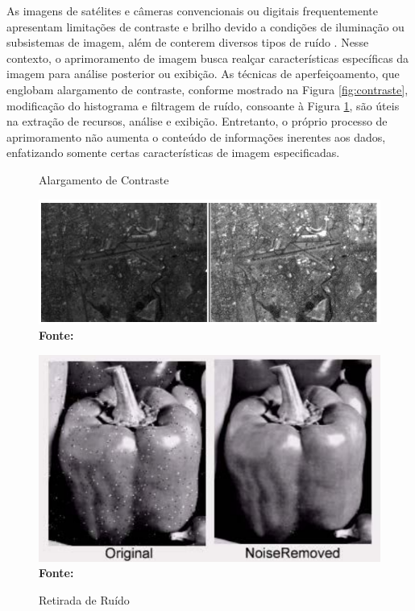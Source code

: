 As imagens de satélites e câmeras convencionais ou digitais frequentemente apresentam limitações de contraste e brilho devido a condições de iluminação ou subsistemas de imagem, além de conterem diversos tipos de ruído \cite{techniques}. Nesse contexto, o aprimoramento de imagem busca realçar características específicas da imagem para análise posterior ou exibição. As técnicas de aperfeiçoamento, que englobam alargamento de contraste, conforme mostrado na Figura \ref{fig:contraste}, modificação do histograma e filtragem de ruído, consoante à Figura \ref{fig:ruido}, são úteis na extração de recursos, análise e exibição. Entretanto, o próprio processo de aprimoramento não aumenta o conteúdo de informações inerentes aos dados, enfatizando somente certas características de imagem especificadas.

\begin{figure}[ht]
\centering
\begin{minipage}[b]{0.45\linewidth}
\centering
\caption{Alargamento de Contraste}
\includegraphics[width=\textwidth]{figuras/Alargamento de Contraste.png}
\label{fig:contraste}
\vspace{-0.2cm}
\textbf{\footnotesize Fonte: \cite{techniques}}
\end{minipage}
\hspace{0.5cm}
\begin{minipage}[b]{0.45\linewidth}
\centering
\caption{Retirada de Ruído}
\includegraphics[width=\textwidth]{figuras/Retirada de Ruido.png}
\label{fig:ruido}
\vspace{-0.2cm}
\textbf{\footnotesize Fonte: \cite{techniques}}
\end{minipage}
\end{figure}




